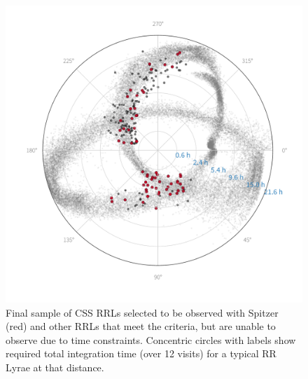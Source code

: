 \documentclass[letterpaper,12pt,preprint]{aastex}
\begin{document}
\begin{figure}
\begin{center}
\includegraphics[width=\textwidth]{final_sample.pdf}
\caption{ Final sample of CSS RRLs selected to be observed with Spitzer (red) and other RRLs that meet the criteria, but are unable to observe due to time constraints. Concentric circles with labels show required total integration time (over 12 visits) for a typical RR Lyrae at that distance. }\label{fig:final_sample}
\end{center}
\end{figure}
\end{document}
